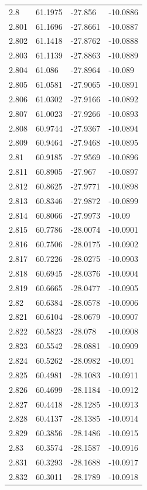 \begin{tabular}{llll}
2.8 & 61.1975 & -27.856 & -10.0886 \\
2.801 & 61.1696 & -27.8661 & -10.0887 \\
2.802 & 61.1418 & -27.8762 & -10.0888 \\
2.803 & 61.1139 & -27.8863 & -10.0889 \\
2.804 & 61.086 & -27.8964 & -10.089 \\
2.805 & 61.0581 & -27.9065 & -10.0891 \\
2.806 & 61.0302 & -27.9166 & -10.0892 \\
2.807 & 61.0023 & -27.9266 & -10.0893 \\
2.808 & 60.9744 & -27.9367 & -10.0894 \\
2.809 & 60.9464 & -27.9468 & -10.0895 \\
2.81 & 60.9185 & -27.9569 & -10.0896 \\
2.811 & 60.8905 & -27.967 & -10.0897 \\
2.812 & 60.8625 & -27.9771 & -10.0898 \\
2.813 & 60.8346 & -27.9872 & -10.0899 \\
2.814 & 60.8066 & -27.9973 & -10.09 \\
2.815 & 60.7786 & -28.0074 & -10.0901 \\
2.816 & 60.7506 & -28.0175 & -10.0902 \\
2.817 & 60.7226 & -28.0275 & -10.0903 \\
2.818 & 60.6945 & -28.0376 & -10.0904 \\
2.819 & 60.6665 & -28.0477 & -10.0905 \\
2.82 & 60.6384 & -28.0578 & -10.0906 \\
2.821 & 60.6104 & -28.0679 & -10.0907 \\
2.822 & 60.5823 & -28.078 & -10.0908 \\
2.823 & 60.5542 & -28.0881 & -10.0909 \\
2.824 & 60.5262 & -28.0982 & -10.091 \\
2.825 & 60.4981 & -28.1083 & -10.0911 \\
2.826 & 60.4699 & -28.1184 & -10.0912 \\
2.827 & 60.4418 & -28.1285 & -10.0913 \\
2.828 & 60.4137 & -28.1385 & -10.0914 \\
2.829 & 60.3856 & -28.1486 & -10.0915 \\
2.83 & 60.3574 & -28.1587 & -10.0916 \\
2.831 & 60.3293 & -28.1688 & -10.0917 \\
2.832 & 60.3011 & -28.1789 & -10.0918 \\

\end{tabular}

